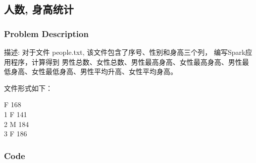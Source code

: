 \documentclass{article}
\begin{document}
    \subsection{人数, 身高统计}

    \subsubsection{Problem Description}

    描述: 对于文件 people.txt, 该文件包含了序号、性别和身高三个列，
    编写Spark应用程序，计算得到
    男性总数、女性总数、男性最高身高、女性最高身高、男性最低身高、女性最低身高、男性平均升高、女性平均身高。

    文件形式如下：

    	F	168 \\
    1	F	141 \\
    2	M	184 \\
    3	F	186

    \subsubsection{Code}
\end{document}
